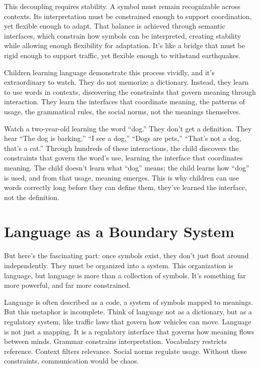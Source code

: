 \documentclass[
  openright]{book}
\begin{document}
This decoupling requires stability. A symbol must remain recognizable
across contexts. Its interpretation must be constrained enough to
support coordination, yet flexible enough to adapt. That balance is
achieved through semantic interfaces, which constrain how symbols can be
interpreted, creating stability while allowing enough flexibility for
adaptation. It's like a bridge that must be rigid enough to support
traffic, yet flexible enough to withstand earthquakes.

Children learning language demonstrate this process vividly, and it's
extraordinary to watch. They do not memorize a dictionary. Instead, they
learn to use words in contexts, discovering the constraints that govern
meaning through interaction. They learn the interfaces that coordinate
meaning, the patterns of usage, the grammatical rules, the social norms,
not the meanings themselves.

Watch a two-year-old learning the word ``dog.'' They don't get a
definition. They hear ``The dog is barking,'' ``I see a dog,'' ``Dogs
are pets,'' ``That's not a dog, that's a cat.'' Through hundreds of
these interactions, the child discovers the constraints that govern the
word's use, learning the interface that coordinates meaning. The child
doesn't learn what ``dog'' means; the child learns how ``dog'' is used,
and from that usage, meaning emerges. This is why children can use words
correctly long before they can define them, they've learned the
interface, not the definition.

\section{Language as a Boundary
System}\label{language-as-a-boundary-system}

But here's the fascinating part: once symbols exist, they don't just
float around independently. They must be organized into a system. This
organization is language, but language is more than a collection of
symbols. It's something far more powerful, and far more constrained.

Language is often described as a code, a system of
symbols mapped to meanings. But this metaphor is incomplete. Think of
language not as a dictionary, but as a regulatory system, like traffic
laws that govern how vehicles can move. Language is not just a mapping.
It is a regulatory interface that governs how meaning flows between
minds. Grammar constrains interpretation. Vocabulary
restricts reference. Context filters relevance. Social norms regulate
usage. Without these constraints, communication would be chaos.
\end{document}
